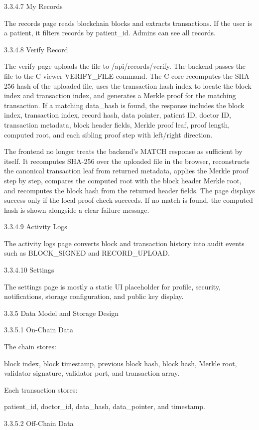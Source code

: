 \documentclass[12pt]{article}
\begin{document}
3.3.4.7 My Records

The records page reads blockchain blocks and extracts transactions. If the user is a patient, it filters records by patient\_id. Admins can see all records.

3.3.4.8 Verify Record

The verify page uploads the file to /api/records/verify. The backend passes the file to the C viewer VERIFY\_FILE command. The C core recomputes the SHA-256 hash of the uploaded file, uses the transaction hash index to locate the block index and transaction index, and generates a Merkle proof for the matching transaction. If a matching data\_hash is found, the response includes the block index, transaction index, record hash, data pointer, patient ID, doctor ID, transaction metadata, block header fields, Merkle proof leaf, proof length, computed root, and each sibling proof step with left/right direction.

The frontend no longer treats the backend's MATCH response as sufficient by itself. It recomputes SHA-256 over the uploaded file in the browser, reconstructs the canonical transaction leaf from returned metadata, applies the Merkle proof step by step, compares the computed root with the block header Merkle root, and recomputes the block hash from the returned header fields. The page displays success only if the local proof check succeeds. If no match is found, the computed hash is shown alongside a clear failure message.

3.3.4.9 Activity Logs

The activity logs page converts block and transaction history into audit events such as BLOCK\_SIGNED and RECORD\_UPLOAD.

3.3.4.10 Settings

The settings page is mostly a static UI placeholder for profile, security, notifications, storage configuration, and public key display.

3.3.5 Data Model and Storage Design

3.3.5.1 On-Chain Data

The chain stores:

 block index, block timestamp, previous block hash, block hash, Merkle root, validator signature, validator port, and transaction array.

Each transaction stores:

 patient\_id, doctor\_id, data\_hash, data\_pointer, and timestamp.

3.3.5.2 Off-Chain Data
\end{document}
